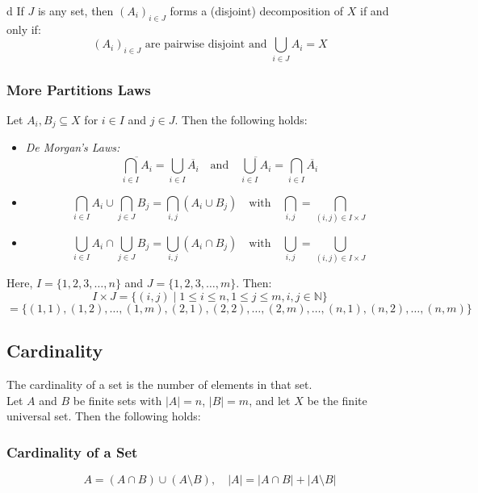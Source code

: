 d If \( J \) is any set, then \( (A_i)_{i \in J} \) forms a (disjoint) decomposition of \( X \) if and only if:
\[
	(A_{i})_{i \in J} \text{ are pairwise disjoint and } \bigcup_{i \in J} A_i = X
\]

\subsubsection{More Partitions Laws}
Let \( A_i, B_j \subseteq X \) for \( i \in I \) and \( j \in J \). Then the following holds:

\begin{itemize}[label=\(-\)]


	\item\emph{De Morgan's Laws:}
	\[
		\overline{\bigcap_{i \in I} A_i}= \bigcup_{i \in I} \overline{A_i} \quad \text{and} \quad \overline{\bigcup_{i \in I} A_i} = \bigcap_{i \in I} \overline{A_i}
	\]

	\item\[
		\bigcap_{i \in I} A_i \cup \bigcap_{j \in J} B_j = \bigcap_{i,j} (A_i \cup B_j) \quad \text{with} \quad \bigcap_{i,j} = \bigcap_{(i,j) \in I \times J}
	\]


	\item\[
		\bigcup_{i \in I} A_i \cap \bigcup_{j \in J} B_j = \bigcup_{i,j} (A_i \cap B_j) \quad \text{with} \quad \bigcup_{i,j} = \bigcup_{(i,j) \in I \times J}
	\]

\end{itemize}
Here, \( I = \{ 1, 2, 3, \dots, n \} \) and \( J = \{ 1, 2, 3, \dots, m \} \). Then:
\[
	I \times J = \{ (i, j) \mid 1 \leq i \leq n, 1 \leq j \leq m, i, j \in \mathbb{N} \}
\]
\[
	= \{ (1, 1), (1, 2), \dots, (1, m), (2, 1), (2, 2), \dots, (2, m), \dots, (n, 1), (n, 2), \dots, (n, m) \}
\]

\subsection{Cardinality}

The cardinality of a set is the number of elements in that set.
\\
Let \( A \) and \( B \) be finite sets with \( |A| = n \), \( |B| = m \), and let \( X \) be the finite universal set. Then the following holds:

\subsubsection*{Cardinality of a Set}
\[
	A = (A \cap B) \cup (A \setminus B), \quad |A| = |A \cap B| + |A \setminus B|
\]

